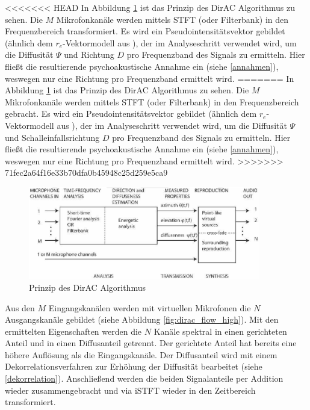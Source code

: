 <<<<<<< HEAD
In Abbildung \ref{fig:dirac_flow_general} ist das Prinzip des DirAC Algorithmus zu sehen. Die $M$ Mikrofonkanäle werden mittels STFT (oder Filterbank) in den Frequenzbereich transformiert. Es wird ein Pseudointensitätsvektor gebildet (ähnlich dem $r_e$-Vektormodell aus \cite{ambi-book}), der im Analyseschritt verwendet wird, um die Diffusität $\Psi$ und Richtung $D$ pro Frequenzband des Signals zu ermitteln. Hier fließt die resultierende psychoakustische Annahme ein (siehe \ref{annahmen}), weswegen nur eine Richtung pro Frequenzband ermittelt wird.
=======
In Abbildung \ref{fig:dirac_flow_general} ist das Prinzip des DirAC Algorithmus zu sehen. Die $M$ Mikrofonkanäle werden mittels STFT (oder Filterbank) in den Frequenzbereich gebracht. Es wird ein Pseudointensitätsvektor gebildet (ähnlich dem $r_e$-Vektormodell aus \cite{ambi-book}), der im Analyseschritt verwendet wird, um die Diffusität $\Psi$ und Schalleinfallsrichtung $D$ pro Frequenzband des Signals zu ermitteln. Hier fließt die resultierende psychoakustische Annahme ein (siehe \ref{annahmen}), weswegen nur eine Richtung pro Frequenzband ermittelt wird.
>>>>>>> 71fec2a64f16e33b70dfa0b45948c25d259e5ca9

\begin{figure}[!ht]
  \centering
  \includegraphics[width=0.9\textwidth]{funktionsweise/pic/pulkki_dirac_flow.png}
  \caption{Prinzip des DirAC Algorithmus\protect\footnotemark}
  \label{fig:dirac_flow_general}
\end{figure}


Aus den $M$ Eingangskanälen werden mit virtuellen Mikrofonen die $N$ Ausgangskanäle gebildet (siehe Abbildung \ref{fig:dirac_flow_high}). Mit den ermittelten Eigenschaften werden die $N$ Kanäle spektral in einen gerichteten Anteil und in einen Diffusanteil getrennt. Der gerichtete Anteil hat bereits eine höhere Auflösung als die Eingangskanäle. Der Diffusanteil wird mit einem Dekorrelationsverfahren zur Erhöhung der Diffusität bearbeitet (siehe \ref{dekorrelation}). Anschließend werden die beiden Signalanteile per Addition wieder zusammengebracht und via iSTFT wieder in den Zeitbereich transformiert.

